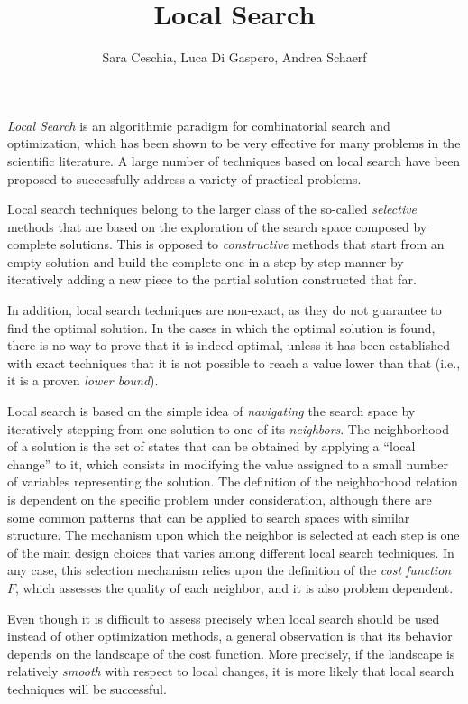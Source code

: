 \title{Local Search}
\label{chp:local-search}
\author{Sara Ceschia, Luca Di Gaspero, Andrea Schaerf}
\maketitle


\emph{Local Search} is an algorithmic paradigm for combinatorial
search and optimization, which has been shown to be very effective for many
problems in the scientific literature. A large number
of techniques based on local search have been proposed to successfully
address a variety of practical problems.


Local search techniques belong to the larger class of the so-called
\emph{selective} methods that are based on the exploration of the
search space composed by complete solutions. This is opposed to
\emph{constructive} methods that start from an empty solution and build the complete one in a step-by-step manner by iteratively adding a new piece to the partial solution constructed
that far.  

In addition, local search techniques are non-exact, as they
do not guarantee to find the optimal solution. In the cases in which
the optimal solution is found, there is no way to prove that it is
indeed optimal, unless it has been established
with exact techniques that it is not possible to reach a value lower than that (i.e., it is a proven \emph{lower bound}).

Local search is based on the simple idea of \emph{navigating} the
search space by iteratively stepping from one solution to one of its
\emph{neighbors}. The neighborhood of a solution is the set of states
that can be obtained by applying a ``local change'' to it, which consists in modifying the value assigned to a small number of variables representing the solution. The
definition of the neighborhood relation is dependent on the specific
problem under consideration, although there are some common
patterns that can be applied to search spaces with
similar structure.  The mechanism upon which the neighbor is selected
at each step is one of the main design choices that varies
among different local search techniques. In any case, this selection
mechanism relies upon the definition of the \emph{cost function} $F$,
which assesses the quality of each neighbor, and it is also
problem dependent.

Even though it is difficult to assess precisely when local search should be 
used instead of other optimization methods, a general observation is that 
its behavior depends on the landscape of the cost function. More precisely, if the 
landscape is relatively \emph{smooth} with respect to local 
changes, it is more likely that local search techniques will be successful.


